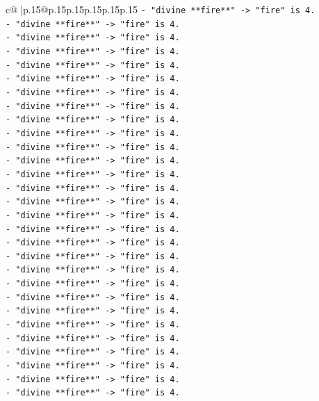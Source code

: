 \documentclass{article}
\begin{document}
{\begin{supertabular}{c@{$\;$}|p{.15\linewidth}@{}p{.15\linewidth}p{.15\linewidth}p{.15\linewidth}p{.15\linewidth}p{.15\linewidth}}
{{{\texttt{{-} "divine **fire**" {-}> "fire" is 4.} \\
\texttt{{-} "divine **fire**" {-}> "fire" is 4.} \\
\texttt{{-} "divine **fire**" {-}> "fire" is 4.} \\
\texttt{{-} "divine **fire**" {-}> "fire" is 4.} \\
\texttt{{-} "divine **fire**" {-}> "fire" is 4.} \\
\texttt{{-} "divine **fire**" {-}> "fire" is 4.} \\
\texttt{{-} "divine **fire**" {-}> "fire" is 4.} \\
\texttt{{-} "divine **fire**" {-}> "fire" is 4.} \\
\texttt{{-} "divine **fire**" {-}> "fire" is 4.} \\
\texttt{{-} "divine **fire**" {-}> "fire" is 4.} \\
\texttt{{-} "divine **fire**" {-}> "fire" is 4.} \\
\texttt{{-} "divine **fire**" {-}> "fire" is 4.} \\
\texttt{{-} "divine **fire**" {-}> "fire" is 4.} \\
\texttt{{-} "divine **fire**" {-}> "fire" is 4.} \\
\texttt{{-} "divine **fire**" {-}> "fire" is 4.} \\
\texttt{{-} "divine **fire**" {-}> "fire" is 4.} \\
\texttt{{-} "divine **fire**" {-}> "fire" is 4.} \\
\texttt{{-} "divine **fire**" {-}> "fire" is 4.} \\
\texttt{{-} "divine **fire**" {-}> "fire" is 4.} \\
\texttt{{-} "divine **fire**" {-}> "fire" is 4.} \\
\texttt{{-} "divine **fire**" {-}> "fire" is 4.} \\
\texttt{{-} "divine **fire**" {-}> "fire" is 4.} \\
\texttt{{-} "divine **fire**" {-}> "fire" is 4.} \\
\texttt{{-} "divine **fire**" {-}> "fire" is 4.} \\
\texttt{{-} "divine **fire**" {-}> "fire" is 4.} \\
\texttt{{-} "divine **fire**" {-}> "fire" is 4.} \\
\texttt{{-} "divine **fire**" {-}> "fire" is 4.} \\
\texttt{{-} "divine **fire**" {-}> "fire" is 4.} \\
\texttt{{-} "divine **fire**" {-}> "fire" is 4.} \\
}}}
\end{supertabular}}
\end{document}
